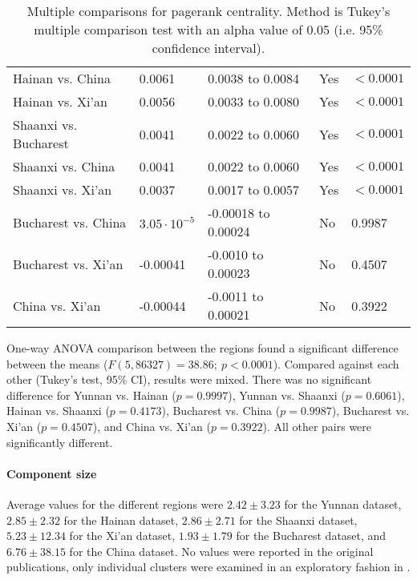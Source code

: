 \begin{table}[htbp]
\begin{mdframed}
\begin{tabular*}{\linewidth}{l|llll}
			Hainan vs. China & 0.0061 & 0.0038 to 0.0084 & Yes & $<0.0001$\\
			Hainan vs. Xi'an & 0.0056 & 0.0033 to 0.0080 & Yes & $<0.0001$\\
			Shaanxi vs. Bucharest & 0.0041 & 0.0022 to 0.0060 & Yes & $<0.0001$\\
			Shaanxi vs. China & 0.0041 & 0.0022 to 0.0060 & Yes & $<0.0001$\\
			Shaanxi vs. Xi'an & 0.0037 &0.0017 to 0.0057 & Yes & $<0.0001$\\
			Bucharest vs. China & $3.05\cdot 10^{-5}$ & -0.00018 to 0.00024 & No & 0.9987\\
			Bucharest vs. Xi'an & -0.00041 & -0.0010 to 0.00023 & No & 0.4507\\
			China vs. Xi'an & -0.00044 & -0.0011 to 0.00021 & No & 0.3922\\
			\hline
		\end{tabular*}
		\caption{Multiple comparisons for pagerank centrality. Method is Tukey's multiple comparison test with an alpha value of 0.05 (i.e. 95\% confidence interval).}
		\label{tab:pagerank_centrality_tukey}
	\end{mdframed}
\end{table}

One-way ANOVA comparison between the regions found a significant difference between the means ($F(5,86327) = 38.86; \: p<0.0001$). Compared against each other (Tukey's test, 95\% CI), results were mixed. There was no significant difference for Yunnan vs. Hainan ($p=0.9997$), Yunnan vs. Shaanxi ($p=0.6061$), Hainan vs. Shaanxi ($p=0.4173$), Bucharest vs. China ($p=0.9987$), Bucharest vs. Xi'an ($p=0.4507$), and China vs. Xi'an ($p=0.3922$). All other pairs were significantly different.

\paragraph{Component size} Average values for the different regions were $2.42\pm3.23$ for the Yunnan dataset, $2.85\pm2.32$ for the Hainan dataset, $2.86\pm2.71$ for the Shaanxi dataset, $5.23\pm12.34$ for the Xi'an dataset, $1.93\pm1.79$ for the Bucharest dataset, and $6.76\pm38.15$ for the China dataset. No values were reported in the original publications, only individual clusters were examined in an exploratory fashion in \cite{hainan_publication,shaanxi_publication,xian_publication}.

